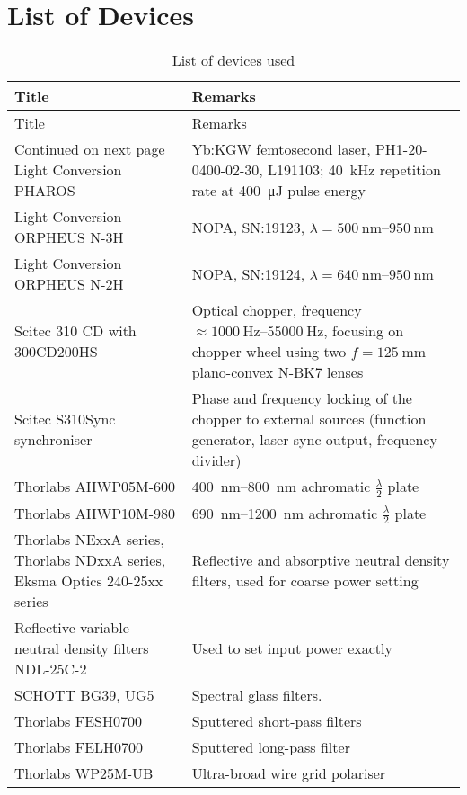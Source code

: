 \documentclass[twoside,openright,listof=numbered]{scrreprt}
\begin{document}
\chapter{List of Devices}
\let\cleardoublepage\clearpage
\begin{longtable}{p{}p{}}
    \caption{List of devices used}
    \label{tab:devices} \\
    \toprule 
    Title & Remarks \\
    \midrule
    \endfirsthead
    \toprule 
    Title & Remarks \\
    \midrule
    \endhead
    \midrule
    Continued on next page
    \endfoot
    \bottomrule
    \endlastfoot
    Light Conversion PHAROS & Yb:KGW femtosecond laser, PH1-20-0400-02-30, L191103; \SI{40}{\kilo\hertz} repetition rate at \SI{400}{\micro\joule} pulse energy \\
    Light Conversion ORPHEUS N-3H & NOPA, SN:19123, $ \lambda = \SIrange{500}{950}{\nano\meter} $ \\
    Light Conversion ORPHEUS N-2H & NOPA, SN:19124, $ \lambda = \SIrange{640}{950}{\nano\meter} $ \\
    Scitec 310 CD with 300CD200HS & Optical chopper, frequency $\approx \SIrange{1000}{55000}{\hertz}$, focusing on chopper wheel using two $f=\SI{125}{\milli\meter}$ plano-convex N-BK7 lenses \\
    Scitec S310Sync synchroniser & Phase and frequency locking of the chopper to external sources (function generator, laser sync output, frequency divider) \\
    Thorlabs AHWP05M-600 & \SIrange{400}{800}{\nano\meter} achromatic $\frac{\lambda}{2}$ plate \\
    Thorlabs AHWP10M-980 & \SIrange{690}{1200}{\nano\meter} achromatic $\frac{\lambda}{2}$ plate \\
    Thorlabs NExxA series, Thorlabs NDxxA series, Eksma Optics 240-25xx series & Reflective and absorptive neutral density filters, used for coarse power setting \\
    Reflective variable neutral density filters
NDL-25C-2 & Used to set input power exactly \\
    SCHOTT BG39, UG5  & Spectral glass filters.\\
    Thorlabs FESH0700 & Sputtered short-pass filters \\
    Thorlabs FELH0700 & Sputtered long-pass filter \\
    Thorlabs WP25M-UB & Ultra-broad wire grid polariser \\

\end{longtable}
\end{document}
